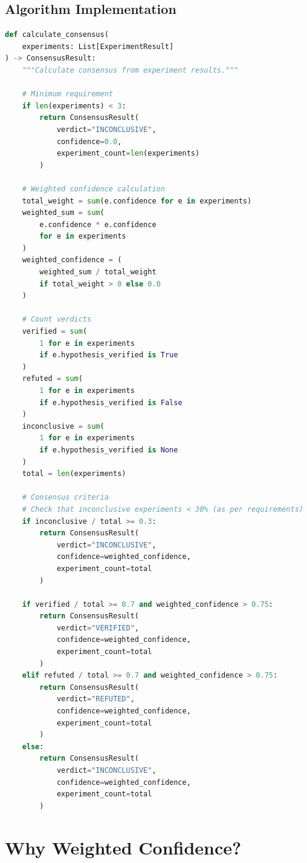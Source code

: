 \documentclass{book}
\begin{document}
\subsection{Algorithm Implementation}

\begin{lstlisting}[language=Python, caption=Consensus Engine Algorithm, label=lst:consensus-algorithm]
def calculate_consensus(
    experiments: List[ExperimentResult]
) -> ConsensusResult:
    """Calculate consensus from experiment results."""

    # Minimum requirement
    if len(experiments) < 3:
        return ConsensusResult(
            verdict="INCONCLUSIVE",
            confidence=0.0,
            experiment_count=len(experiments)
        )

    # Weighted confidence calculation
    total_weight = sum(e.confidence for e in experiments)
    weighted_sum = sum(
        e.confidence * e.confidence
        for e in experiments
    )
    weighted_confidence = (
        weighted_sum / total_weight
        if total_weight > 0 else 0.0
    )

    # Count verdicts
    verified = sum(
        1 for e in experiments
        if e.hypothesis_verified is True
    )
    refuted = sum(
        1 for e in experiments
        if e.hypothesis_verified is False
    )
    inconclusive = sum(
        1 for e in experiments
        if e.hypothesis_verified is None
    )
    total = len(experiments)

    # Consensus criteria
    # Check that inconclusive experiments < 30% (as per requirements)
    if inconclusive / total >= 0.3:
        return ConsensusResult(
            verdict="INCONCLUSIVE",
            confidence=weighted_confidence,
            experiment_count=total
        )

    if verified / total >= 0.7 and weighted_confidence > 0.75:
        return ConsensusResult(
            verdict="VERIFIED",
            confidence=weighted_confidence,
            experiment_count=total
        )
    elif refuted / total >= 0.7 and weighted_confidence > 0.75:
        return ConsensusResult(
            verdict="REFUTED",
            confidence=weighted_confidence,
            experiment_count=total
        )
    else:
        return ConsensusResult(
            verdict="INCONCLUSIVE",
            confidence=weighted_confidence,
            experiment_count=total
        )
\end{lstlisting}

\section{Why Weighted Confidence?}
\end{document}
